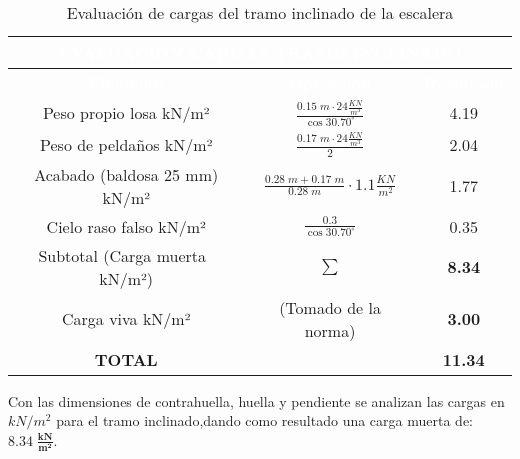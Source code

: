 \documentclass[12pt]{article}
\begin{document}
\begin{table}[H]
\centering

\begin{tabular}{|c|c|c|} 
\hline
\multicolumn{3}{|c|}{{\cellcolor[rgb]{0.227,0.227,0.227}}\textcolor{white}{\textbf{EVALUACIÓN CARGAS TRAMO INCLINADO}}}                                 \\ 
\hline
\rowcolor[rgb]{0.227,0.227,0.227} \textcolor{white}{\textbf{Elemento}} & \textcolor{white}{\textbf{Operación}} & \textcolor{white}{\textbf{Resultado}}  \\ 
\hline
{\cellcolor[rgb]{1 ,1 ,1}}Peso propio losa
  kN/m²           &   $\frac{0.15\;m \cdot 24 \tfrac{KN}{m^3}}{\cos{30.70^{\circ}}}$                                  & 4.19                                 \\ 
\hline
{\cellcolor[rgb]{1,1,1}}Peso de peldaños
  kN/m²           & $\frac{0.17\;m \cdot 24 \tfrac{KN}{m^3}}{2}$                                     & 2.04                                 \\ 
\hline  
{\cellcolor[rgb]{1,1,1}}Acabado (baldosa 25
  mm) kN/m²    &  $\frac{0.28\;m + 0.17\;m}{0.28\;m}\cdot 1.1\tfrac{KN}{m^2}$                                    & 1.77                                   \\ 
\hline
{\cellcolor[rgb]{1,1,1}}Cielo raso falso kN/m²                   & $\frac{0.3}{\cos{30.70^{\circ}}}$                                      & 0.35                                   \\ 
\hline
{\cellcolor[rgb]{1,1,1}}Subtotal (Carga
  muerta~ kN/m²)   & $\mathbf{\sum}$                                    & \textbf{8.34  }                                 \\ 
\hline
{\cellcolor[rgb]{1,1,1}}Carga viva kN/m²                   & (Tomado de la norma)                                     & \textbf{3.00}                                   \\ 
\hline
{\cellcolor[rgb]{1,1,1}}\textbf{TOTAL}                     & ~                                     & \textbf{11.34}                         \\
\hline
\end{tabular}
\caption{Evaluación de cargas del tramo inclinado de la escalera}
\label{tab:evalINCLIN}
\end{table}

Con las dimensiones de contrahuella, huella y pendiente se analizan las cargas en $kN/m^2$ para el tramo inclinado,dando como resultado una carga muerta de: $\mathbf{8.34\; \tfrac{kN}{m^2}}$.\\
\end{document}
